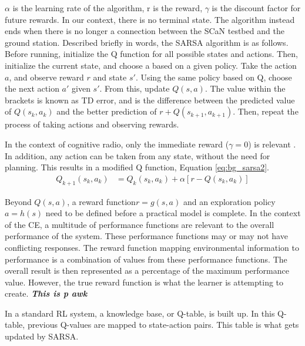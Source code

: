 \documentclass[11pt]{report}
\begin{document}
		\par $\alpha$ is the learning rate of the algorithm, r is the reward, $\gamma$ is the discount factor for future rewards. In our context, there is no terminal state. The algorithm instead ends when there is no longer a connection between the SCaN testbed and the ground station. Described briefly in words, the SARSA algorithm is as follows. Before running, initialize the Q function for all possible states and actions. Then, initialize the current state, and choose a based on a given policy. Take the action $a$, and observe reward $r$ and state $s'$. Using the same policy based on Q, choose the next action $a'$ given $s'$. From this, update $Q(s,a)$. The value within the brackets is known as TD error, and is the difference between the predicted value of $Q(s_k,a_k)$ and the better prediction of $r + Q(s_{k+1},a_{k+1})$. Then, repeat the process of taking actions and observing rewards. 
	\par In the context of cognitive radio, only the immediate reward ($\gamma = 0$) is relevant \cite{AIAA_Paper}. In addition, any action can be taken from any state, without the need for planning. This results in a modified Q function, Equation \ref{eq:bg_sarsa2}.
	\begin{align}
		Q_{k+1}(s_k,a_k) &= Q_k(s_k,a_k) + \alpha[r - Q(s_k,a_k)] \label{eq:bg_sarsa2}
	\end{align}
	\par Beyond $Q(s,a)$, a reward function$r = g(s,a)$ and an exploration policy $a = h(s)$ need to be defined before a practical model is complete. In the context of the CE, a multitude of performance functions are relevant to the overall performance of the system. These performance functions may or may not have conflicting responses. The reward function mapping environmental information to performance is a combination of values from these performance functions. The overall result is then represented as a percentage of the maximum performance value. However, the true reward function is what the learner is attempting to create. \textbf{\textit{ This is p awk}}  
	\par In a standard RL system, a knowledge base, or Q-table, is built up. In this Q-table, previous Q-values are mapped to state-action pairs. This table is what gets updated by SARSA. 
	
\end{document}
